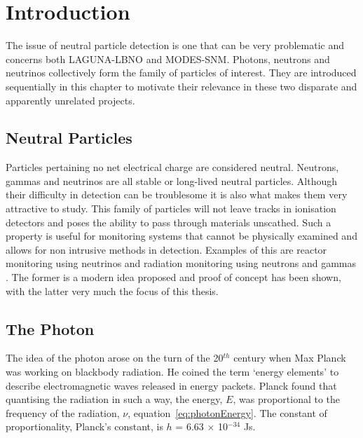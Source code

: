 \chapter{Introduction}


The issue of neutral particle detection is one that can be very problematic and concerns both LAGUNA-LBNO and MODES-SNM. Photons, neutrons and neutrinos collectively form the family of particles of interest. They are introduced sequentially in this chapter to motivate their relevance in these two disparate and apparently unrelated projects.

\section{Neutral Particles}
Particles pertaining no net electrical charge are considered neutral. Neutrons, gammas and neutrinos are all stable or long-lived neutral particles. Although their difficulty in detection can be troublesome it is also what makes them very attractive to study. This family of particles will not leave tracks in ionisation detectors and poses the ability to pass through materials unscathed.  Such a property is useful for monitoring systems that cannot be physically examined and allows for non intrusive methods in detection. Examples of this are reactor monitoring using neutrinos \cite{neutrinoReactorMonitoring} and radiation monitoring using neutrons and gammas \cite{website:modes}. The former is a modern idea proposed and proof of concept has been shown, with the latter very much the focus of this thesis.

\section{The Photon}
The idea of the photon arose on the turn of the 20$^{th}$ century when Max Planck was working on blackbody radiation. He coined the term `energy elements' \cite{maxPlanckPackets} to describe electromagnetic waves released in energy packets. Planck found that quantising the radiation in such a way, the energy, $E$, was proportional to the frequency of the radiation, $\nu$, equation~\ref{eq:photonEnergy}. The constant of proportionality, Planck's constant, is $h$ = 6.63 $\times$ 10$^{-34}$ Js. 

